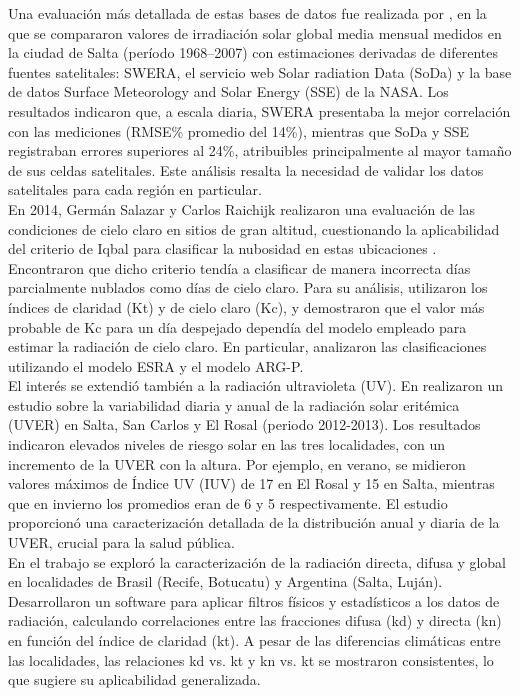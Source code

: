 Una evaluación más detallada de estas bases de datos fue realizada por \cite{Salazar2013}, en la que se compararon valores de irradiación solar global media mensual medidos en la ciudad de Salta (período 1968–2007) con estimaciones derivadas de diferentes fuentes satelitales: SWERA, el servicio web Solar radiation Data (SoDa) \citep{Wald2004} y la base de datos Surface Meteorology and Solar Energy (SSE) de la NASA. Los resultados indicaron que, a escala diaria, SWERA presentaba la mejor correlación con las mediciones (RMSE\% promedio del 14\%), mientras que SoDa y SSE registraban errores superiores al 24\%, atribuibles principalmente al mayor tamaño de sus celdas satelitales. Este análisis resalta la necesidad de validar los datos satelitales para cada región en particular.\\


En 2014, Germán Salazar y Carlos Raichijk realizaron una evaluación de las condiciones de cielo claro en sitios de gran altitud, cuestionando la aplicabilidad del criterio de Iqbal para clasificar la nubosidad en estas ubicaciones \cite{Salazar2014}. Encontraron que dicho criterio tendía a clasificar de manera incorrecta días parcialmente nublados como días de cielo claro. Para su análisis, utilizaron los índices de claridad (Kt) y de cielo claro (Kc), y demostraron que el valor más probable de Kc para un día despejado dependía del modelo empleado para estimar la radiación de cielo claro. En particular, analizaron las clasificaciones utilizando el modelo ESRA \citep{Rigollier2000} y el modelo ARG-P.\\

El interés se extendió también a la radiación ultravioleta (UV). En \cite{Suazarez2014} realizaron un estudio sobre la variabilidad diaria y anual de la radiación solar eritémica (UVER) en Salta, San Carlos y El Rosal (periodo 2012-2013). Los resultados indicaron elevados niveles de riesgo solar en las tres localidades, con un incremento de la UVER con la altura. Por ejemplo, en verano, se midieron valores máximos de Índice UV (IUV) de 17 en El Rosal y 15 en Salta, mientras que en invierno los promedios eran de 6 y 5 respectivamente. El estudio proporcionó una caracterización detallada de la distribución anual y diaria de la UVER, crucial para la salud pública.\\

En el trabajo \cite{Vilela2015} se exploró la caracterización de la radiación directa, difusa y global en localidades de Brasil (Recife, Botucatu) y Argentina (Salta, Luján). Desarrollaron un software para aplicar filtros físicos y estadísticos a los datos de radiación, calculando correlaciones entre las fracciones difusa (kd) y directa (kn) en función del índice de claridad (kt). A pesar de las diferencias climáticas entre las localidades, las relaciones kd vs. kt y kn vs. kt se mostraron consistentes, lo que sugiere su aplicabilidad generalizada.\\

